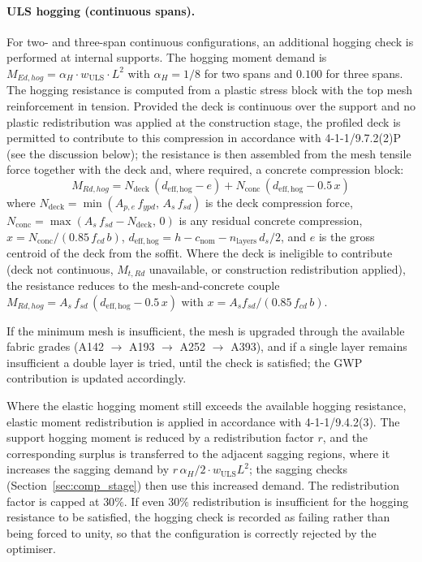 \paragraph{ULS hogging (continuous spans).}
\label{sec:hogging}
For two- and three-span continuous configurations, an additional hogging check is performed at internal supports. The hogging moment demand is $M_{Ed,hog} = \alpha_H \cdot w_\mathrm{ULS} \cdot L^2$ with $\alpha_H = 1/8$ for two spans and $0.100$ for three spans. The hogging resistance is computed from a plastic stress block with the top mesh reinforcement in tension. Provided the deck is continuous over the support and no plastic redistribution was applied at the construction stage, the profiled deck is permitted to contribute to this compression in accordance with 4-1-1/9.7.2(2)P (see the discussion below); the resistance is then assembled from the mesh tensile force together with the deck and, where required, a concrete compression block:
\begin{equation}
    M_{Rd,hog} = N_\mathrm{deck}\,(d_\mathrm{eff,hog} - e) + N_\mathrm{conc}\,(d_\mathrm{eff,hog} - 0.5\,x)
    \label{eq:hogging}
\end{equation}
where $N_\mathrm{deck} = \min(A_{p,e}\,f_{ypd},\,A_s\,f_{sd})$ is the deck compression force, $N_\mathrm{conc} = \max(A_s\,f_{sd} - N_\mathrm{deck},\,0)$ is any residual concrete compression, $x = N_\mathrm{conc}/(0.85\,f_{cd}\,b)$, $d_\mathrm{eff,hog} = h - c_\mathrm{nom} - n_\mathrm{layers}\,d_s/2$, and $e$ is the gross centroid of the deck from the soffit. Where the deck is ineligible to contribute (deck not continuous, $M_{t,Rd}$ unavailable, or construction redistribution applied), the resistance reduces to the mesh-and-concrete couple $M_{Rd,hog} = A_s\,f_{sd}\,(d_\mathrm{eff,hog} - 0.5\,x)$ with $x = A_s f_{sd}/(0.85\,f_{cd}\,b)$.

If the minimum mesh is insufficient, the mesh is upgraded through the available fabric grades (A142 $\rightarrow$ A193 $\rightarrow$ A252 $\rightarrow$ A393), and if a single layer remains insufficient a double layer is tried, until the check is satisfied; the GWP contribution is updated accordingly.

Where the elastic hogging moment still exceeds the available hogging resistance, elastic moment redistribution is applied in accordance with 4-1-1/9.4.2(3). The support hogging moment is reduced by a redistribution factor $r$, and the corresponding surplus is transferred to the adjacent sagging regions, where it increases the sagging demand by $r\,\alpha_H/2 \cdot w_\mathrm{ULS} L^2$; the sagging checks (Section~\ref{sec:comp_stage}) then use this increased demand. The redistribution factor is capped at $30\%$. If even $30\%$ redistribution is insufficient for the hogging resistance to be satisfied, the hogging check is recorded as failing rather than being forced to unity, so that the configuration is correctly rejected by the optimiser.


